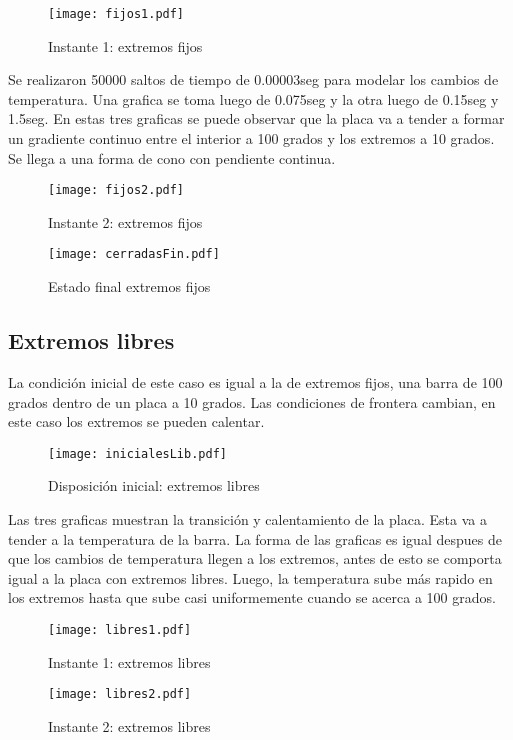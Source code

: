 \documentclass[12pt]{article}
\begin{document}
\begin{figure}[h!]
\centering
\texttt{[image: fijos1.pdf]}
\caption{Instante 1: extremos fijos}
\label{Fig.}
\end{figure}

Se realizaron 50000 saltos de tiempo de 0.00003seg para modelar los cambios de temperatura. Una grafica se toma luego de 0.075seg y la otra luego de 0.15seg y 1.5seg. En estas tres graficas se puede observar que la placa va a tender a formar un gradiente continuo entre el interior a 100 grados y los extremos a 10 grados. Se llega a una forma de cono con pendiente continua.

\begin{figure}[h!]
\centering
\texttt{[image: fijos2.pdf]}
\caption{Instante 2: extremos fijos}
\label{Fig.}
\end{figure}

\begin{figure}[h!]
\centering
\texttt{[image: cerradasFin.pdf]}
\caption{Estado final extremos fijos}
\label{Fig.}
\end{figure}

\subsection{Extremos libres}

La condición inicial de este caso es igual a la de extremos fijos, una barra de 100 grados dentro de un placa a 10 grados. Las condiciones de frontera cambian, en este caso los extremos se pueden calentar. 

\begin{figure}[h!]
\centering
\texttt{[image: inicialesLib.pdf]}
\caption{Disposición inicial: extremos libres}
\label{Fig.}
\end{figure}
Las tres graficas muestran la transición y calentamiento de la placa. Esta va a tender a la temperatura de la barra. La forma de las graficas es igual despues de que los cambios de temperatura llegen a los extremos, antes de esto se comporta igual a la placa con extremos libres. Luego, la temperatura sube más rapido en los extremos hasta que sube casi uniformemente cuando se acerca a 100 grados.
\begin{figure}[h!]
\centering
\texttt{[image: libres1.pdf]}
\caption{Instante 1: extremos libres}
\label{Fig.}
\end{figure}

\begin{figure}[h!]
\centering
\texttt{[image: libres2.pdf]}
\caption{Instante 2: extremos libres}
\label{Fig.}
\end{figure}
\end{document}
